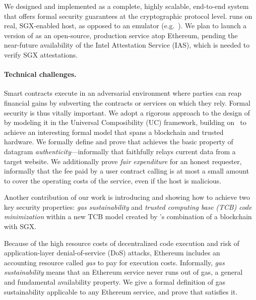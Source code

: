 We designed and implemented \tc as a complete, highly scalable, end-to-end system that offers formal security guarantees at the cryptographic protocol level. \tc runs on real, SGX-enabled host, as opposed to an emulator (e.g.~\cite{haven,VC3}). We plan to launch a version of \tc as an open-source, production service atop Ethereum, pending the near-future availability of the Intel Attestation Service (IAS), which is needed to verify SGX attestations. 


\paragraph{Technical challenges.} Smart contracts execute in an adversarial environment where parties can reap financial gains by subverting the contracts or services on which they rely. Formal security is thus vitally important. We adopt a rigorous approach to the design of \tcs by modeling it in the Universal Composibility (UC) framework, building on~\cite{hawk,sgxsok} to achieve an interesting formal model that spans a blockchain and trusted hardware. We formally define and prove that \tc achieves the basic property of datagram {\em authenticity}---informally that \tc faithfully relays current data from a target website. We additionally prove {\em fair expenditure} for an honest requester, informally that the fee paid by a user contract calling \tc is at most a small amount to cover the operating costs of the \tc service, even if the \tc host is malicious.

Another contribution of our work is introducing and showing how to achieve two key security properties: {\em gas sustainability} and {\em trusted computing base (TCB) code minimization} within a new TCB model created by \tc's combination of a blockchain with SGX. 

Because of the high resource costs of decentralized code execution and risk of application-layer denial-of-service (DoS) attacks, Ethereum includes an accounting resource called {\em gas} to pay for execution costs.  Informally, {\em gas sustainability} means that an Ethereum service never runs out of gas, a general and fundamental availability property. We give a formal definition of gas sustainability applicable to any Ethereum service, and prove that \tc satisfies it.

